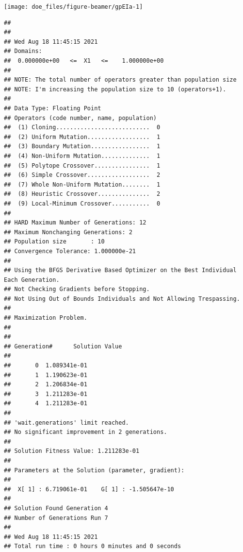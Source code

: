 \documentclass[
  ignorenonframetext,
]{beamer}
\newenvironment{Shaded}{\begin{snugshade}}{\end{snugshade}}
\newcommand{\AttributeTok}[1]{\textcolor[rgb]{0.77,0.63,0.00}{#1}}
\newcommand{\DecValTok}[1]{\textcolor[rgb]{0.00,0.00,0.81}{#1}}
\newcommand{\FunctionTok}[1]{\textcolor[rgb]{0.00,0.00,0.00}{#1}}
\newcommand{\NormalTok}[1]{#1}
\newcommand{\OtherTok}[1]{\textcolor[rgb]{0.56,0.35,0.01}{#1}}
\newcommand{\SpecialCharTok}[1]{\textcolor[rgb]{0.00,0.00,0.00}{#1}}
\begin{document}
\begin{frame}{}
\protect\hypertarget{section-52}{}
\begin{center}\texttt{[image: doe\_files/figure-beamer/gpEIa-1]} \end{center}
\end{frame}

\begin{frame}[fragile]{}
\protect\hypertarget{section-53}{}
\begin{Shaded}
\end{Shaded}

\begin{verbatim}
## 
## 
## Wed Aug 18 11:45:15 2021
## Domains:
##  0.000000e+00   <=  X1   <=    1.000000e+00 
## 
## NOTE: The total number of operators greater than population size
## NOTE: I'm increasing the population size to 10 (operators+1).
## 
## Data Type: Floating Point
## Operators (code number, name, population) 
##  (1) Cloning...........................  0
##  (2) Uniform Mutation..................  1
##  (3) Boundary Mutation.................  1
##  (4) Non-Uniform Mutation..............  1
##  (5) Polytope Crossover................  1
##  (6) Simple Crossover..................  2
##  (7) Whole Non-Uniform Mutation........  1
##  (8) Heuristic Crossover...............  2
##  (9) Local-Minimum Crossover...........  0
## 
## HARD Maximum Number of Generations: 12
## Maximum Nonchanging Generations: 2
## Population size       : 10
## Convergence Tolerance: 1.000000e-21
## 
## Using the BFGS Derivative Based Optimizer on the Best Individual Each Generation.
## Not Checking Gradients before Stopping.
## Not Using Out of Bounds Individuals and Not Allowing Trespassing.
## 
## Maximization Problem.
## 
## 
## Generation#      Solution Value
## 
##       0  1.089341e-01
##       1  1.190623e-01
##       2  1.206834e-01
##       3  1.211283e-01
##       4  1.211283e-01
## 
## 'wait.generations' limit reached.
## No significant improvement in 2 generations.
## 
## Solution Fitness Value: 1.211283e-01
## 
## Parameters at the Solution (parameter, gradient):
## 
##  X[ 1] : 6.719061e-01    G[ 1] : -1.505647e-10
## 
## Solution Found Generation 4
## Number of Generations Run 7
## 
## Wed Aug 18 11:45:15 2021
## Total run time : 0 hours 0 minutes and 0 seconds
\end{verbatim}
\end{frame}
\end{document}
